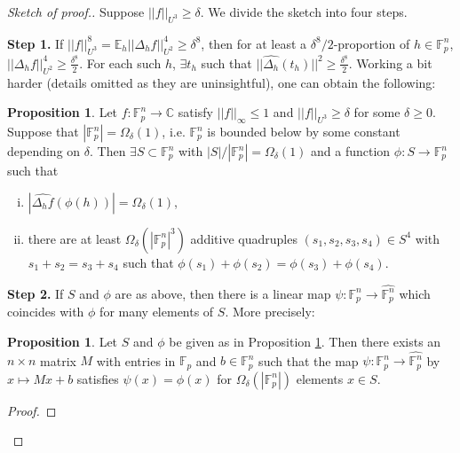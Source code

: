 \documentclass{article}
\theoremstyle{definition}
\newtheorem{prop}[theorem]{Proposition}
\begin{document}
\begin{proof}[Sketch of proof.]
    Suppose $||f||_{U^3}\ge \delta$. We divide the sketch into four steps.
    \vspace{1mm}
     
    \textbf{Step 1.} If $||f||_{U^3}^8 = \mathbb{E}_h ||\Delta_h f||_{U^2}^4\ge \delta^8$, then for at least a $\delta^8/2$-proportion of $h \in \mathbb{F}_p^n$, $||\Delta_h f||_{U^2}^4 \ge \frac{\delta^8}{2}$. For each such $h$, $\exists t_h$ such that $||\widehat{\Delta_h}(t_h)||^2\ge \frac{\delta^8}{2}$. Working a bit harder (details omitted as they are uninsightful), one can obtain the following:
    \begin{prop}\label{prop4.15}
        Let $f : \mathbb{F}_p^n \to \mathbb{C}$ satisfy $||f||_{\infty}\le 1$ and $||f||_{U^3}\ge \delta$ for some $\delta\ge 0$. Suppose that $\left|\mathbb{F}_p^n\right| = \Omega_{\delta}(1)$, i.e. $\mathbb{F}_p^n$ is bounded below by some constant depending on $\delta$. Then $\exists S \subset \mathbb{F}_p^n$ with $\left|S\right|/\left|\mathbb{F}_p^n\right| = \Omega_{\delta}(1)$ and a function $\phi: S \to \mathbb{F}_p^n$ such that
        \begin{enumerate}[(i)]
            \item $\left|\widehat{\Delta_hf}(\phi(h))\right| = \Omega_\delta(1)$,
            \item there are at least $\Omega_{\delta}(\left|\mathbb{F}_p^n\right|^3)$ additive quadruples $(s_1,s_2,s_3,s_4) \in S^4$ with $s_1+s_2=s_3+s_4$ such that $\phi(s_1)+\phi(s_2)=\phi(s_3)+\phi(s_4)$.
        \end{enumerate}
    \end{prop}
    \textbf{Step 2.} If $S$ and $\phi$ are as above, then there is a linear map $\psi : \mathbb{F}_p^n \to \widehat{\mathbb{F}_p^n}$ which coincides with $\phi$ for many elements of $S$. More precisely:
    \begin{prop}\label{prop4.16}
        Let $S$ and $\phi$ be given as in Proposition \ref{prop4.15}. Then there exists an $n \times n$ matrix $M$ with entries in $\mathbb{F}_p$ and $b \in \mathbb{F}_p^n$ such that the map $\psi : \mathbb{F}_p^n \to \widehat{\mathbb{F}_p^n}$ by $x \mapsto Mx+b$ satisfies $\psi(x)=\phi(x)$ for $\Omega_\delta(\left|\mathbb{F}_p^n\right|)$ elements $x \in S$.
    \end{prop}
    \begin{proof}

\end{proof}
\end{proof}
\end{document}
